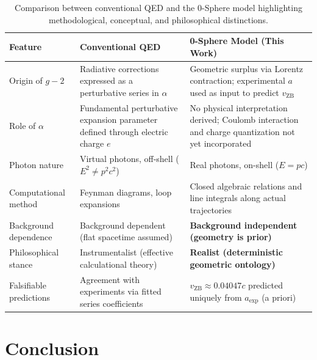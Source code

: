 \documentclass[12pt,letterpaper]{article}
\begin{document}
\begin{table}[h!]
\centering
\renewcommand{\arraystretch}{1.3}
\begin{tabularx}{\textwidth}{l X X}
\toprule
\textbf{Feature} & \textbf{Conventional QED} & \textbf{0-Sphere Model (This Work)} \\
\midrule
Origin of $g-2$ 
& Radiative corrections expressed as a perturbative series in $\alpha$ 
& Geometric surplus via Lorentz contraction; experimental $a$ used as input to predict $v_{\mathrm{ZB}}$ \\

Role of $\alpha$ 
& Fundamental perturbative expansion parameter defined through electric charge $e$ 
& No physical interpretation derived; Coulomb interaction and charge quantization not yet incorporated \\

Photon nature 
& Virtual photons, off-shell ($E^2 \neq p^2c^2$) 
& Real photons, on-shell ($E = pc$) \\

Computational method 
& Feynman diagrams, loop expansions 
& Closed algebraic relations and line integrals along actual trajectories \\

Background dependence 
& Background dependent (flat spacetime assumed) 
& \textbf{Background independent (geometry is prior)} \\

Philosophical stance 
& Instrumentalist (effective calculational theory) 
& \textbf{Realist (deterministic geometric ontology)} \\

Falsifiable predictions 
& Agreement with experiments via fitted series coefficients 
& $v_{\mathrm{ZB}} \approx 0.04047c$ predicted uniquely from $a_{\mathrm{exp}}$ (a priori) \\
\bottomrule
\end{tabularx}
\caption{Comparison between conventional QED and the 0-Sphere model highlighting methodological, conceptual, and philosophical distinctions.}
\label{tab:qed_comparison}
\end{table}



\section{Conclusion}
\end{document}
